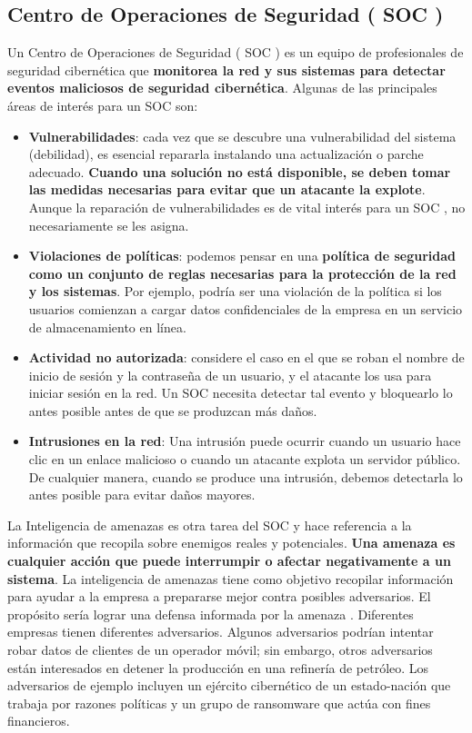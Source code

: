 \subsection{Centro de Operaciones de Seguridad ( SOC )}
Un Centro de Operaciones de Seguridad ( SOC ) es un equipo de profesionales de seguridad cibernética que \textbf{monitorea la red y sus sistemas para detectar eventos maliciosos de seguridad cibernética}. Algunas de las principales áreas de interés para un SOC son:
\begin{itemize}
\item \textbf{Vulnerabilidades}: cada vez que se descubre una vulnerabilidad del sistema (debilidad), es esencial repararla instalando una actualización o parche adecuado. \textbf{Cuando una solución no está disponible, se deben tomar las medidas necesarias para evitar que un atacante la explote}. Aunque la reparación de vulnerabilidades es de vital interés para un SOC , no necesariamente se les asigna.
\item \textbf{Violaciones de políticas}: podemos pensar en una \textbf{política de seguridad como un conjunto de reglas necesarias para la protección de la red y los sistemas}. Por ejemplo, podría ser una violación de la política si los usuarios comienzan a cargar datos confidenciales de la empresa en un servicio de almacenamiento en línea.
\item \textbf{Actividad no autorizada}: considere el caso en el que se roban el nombre de inicio de sesión y la contraseña de un usuario, y el atacante los usa para iniciar sesión en la red. Un SOC necesita detectar tal evento y bloquearlo lo antes posible antes de que se produzcan más daños.

\item \textbf{Intrusiones en la red}: Una intrusión puede ocurrir cuando un usuario hace clic en un enlace malicioso o cuando un atacante explota un servidor público. De cualquier manera, cuando se produce una intrusión, debemos detectarla lo antes posible para evitar daños mayores.
\end{itemize}

La Inteligencia de amenazas es otra tarea del SOC y hace referencia  a la información que recopila sobre enemigos reales y potenciales. \textbf{Una amenaza es cualquier acción que puede interrumpir o afectar negativamente a un sistema}. La inteligencia de amenazas tiene como objetivo recopilar información para ayudar a la empresa a prepararse mejor contra posibles adversarios. El propósito sería lograr una defensa informada por la amenaza . Diferentes empresas tienen diferentes adversarios. Algunos adversarios podrían intentar robar datos de clientes de un operador móvil; sin embargo, otros adversarios están interesados en detener la producción en una refinería de petróleo. Los adversarios de ejemplo incluyen un ejército cibernético de un estado-nación que trabaja por razones políticas y un grupo de ransomware que actúa con fines financieros. 

